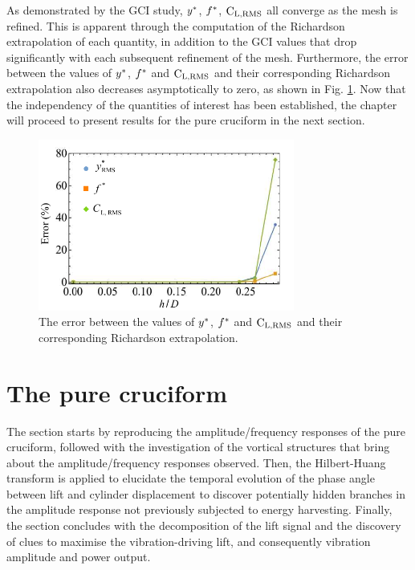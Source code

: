 \documentclass[oneside]{utmthesis}
\begin{document}
As demonstrated by the GCI study, $y^{*}$, $f^{*}$, $\text{C}_{\text{L,RMS}}$ all converge as the mesh is refined. This is apparent through the computation of the Richardson extrapolation of each quantity, in addition to the GCI values that drop significantly with each subsequent refinement of the mesh. Furthermore, the error between the values of $y^{*}$, $f^{*}$ and $\text{C}_{\text{L,RMS}}$ and their corresponding Richardson extrapolation also decreases asymptotically to zero, as shown in Fig. \ref{fig:richardsonError}. Now that the independency of the quantities of interest has been established, the chapter will proceed to present results for the pure cruciform in the next section.

\begin{figure}[!h]
  \centering
  \hspace{1cm} \includegraphics[width=0.75\textwidth]{figs/richardsonError}
  \caption{The error between the values of $y^{*}$, $f^{*}$ and $\text{C}_{\text{L,RMS}}$ and their corresponding Richardson extrapolation.}
  \label{fig:richardsonError}
\end{figure}

\section{The pure cruciform}\label{sec:svivRegime}

The section starts by reproducing the amplitude/frequency responses of the pure cruciform, followed with the investigation of the vortical structures that bring about the amplitude/frequency responses observed. Then, the Hilbert-Huang transform is applied to elucidate the temporal evolution of the phase angle between lift and cylinder displacement to discover potentially hidden branches in the amplitude response not previously subjected to energy harvesting. Finally, the section concludes with the decomposition of the lift signal and the discovery of clues to maximise the vibration-driving lift, and consequently vibration amplitude and power output.
\end{document}
